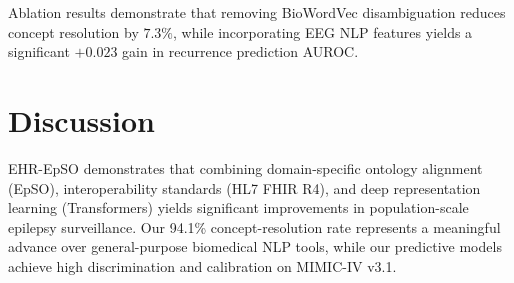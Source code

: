 \documentclass[11pt,a4paper]{article}
\begin{document}
\begin{table}[h!]
\centering
\caption{\textbf{Systematic Ablation Analysis of Pipeline Stages and Feature Domain Contributions.}}
\label{tab:ablation}
\end{table}

Ablation results demonstrate that removing BioWordVec disambiguation reduces concept resolution by $7.3\%$, while incorporating EEG NLP features yields a significant $+0.023$ gain in recurrence prediction AUROC.

\section{Discussion}

EHR-EpSO demonstrates that combining domain-specific ontology alignment (EpSO), interoperability standards (HL7 FHIR R4), and deep representation learning (Transformers) yields significant improvements in population-scale epilepsy surveillance. Our 94.1\% concept-resolution rate represents a meaningful advance over general-purpose biomedical NLP tools, while our predictive models achieve high discrimination and calibration on MIMIC-IV v3.1.
\end{document}
